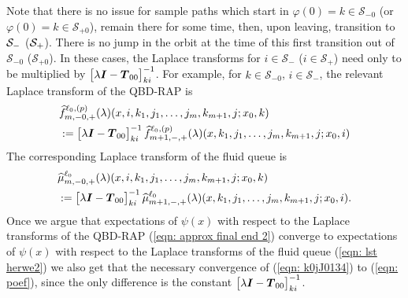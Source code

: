 Note that there is no issue for sample paths which start in \(\varphi(0)=k\in\mathcal S_{-0}\) (or \(\varphi(0)=k\in\mathcal S_{+0}\)), remain there for some time, then, upon leaving, transition to \(\mathcal{S}_-\) (\(\mathcal{S}_+\)). There is no jump in the orbit at the time of this first transition out of \(\mathcal S_{-0}\) (\(\mathcal S_{+0}\)). In these cases, the Laplace transforms for \(i\in\mathcal S_-\) (\(i\in\mathcal S_+\)) need only to be multiplied by \(\begin{bmatrix} \lambda \boldsymbol I - \boldsymbol T_{00} \end{bmatrix}^{-1}_{ki}\). For example, for \(k\in\mathcal S_{-0}\), \(i\in\mathcal S_{-}\), the relevant Laplace transform of the QBD-RAP is 
\begin{align}
		\nonumber &\widehat{f}_{m,-0,+}^{\ell_0,(p)}(\lambda)(x,i,k_1,j_1,\dots,j_m,k_{m+1},j;x_0,k) 
		\\&:=\vligne{\lambda \bs I - \bs T_{00}}^{-1}_{ki}\widehat{f}_{m+1,-,+}^{\ell_0,(p)}(\lambda)(x,k_1,j_1,\dots,j_m,k_{m+1},j;x_0,i)
		\label{eqn: k0jJ0134}%
\end{align} 
The corresponding Laplace transform of the fluid queue is 
\begin{align}
	&\widehat \mu_{m,-0,+}^{\ell_0}(\lambda)(x,i,k_1,j_1,\dots,j_m,k_{m+1},j;x_0,k) \nonumber 
	\\&:= \begin{bmatrix} \lambda \boldsymbol I - \boldsymbol T_{00} \end{bmatrix}^{-1}_{ki}\widehat \mu_{m+1,-,+}^{\ell_0}(\lambda)(x,k_1,j_1,\dots,j_m,k_{m+1},j;x_0,i). \label{eqn:  poef}
\end{align}
Once we argue that expectations of \(\psi(x)\) with respect to the Laplace transforms of the QBD-RAP (\ref{eqn: approx final end 2}) converge to expectations of \(\psi(x)\) with respect to the Laplace transforms of the fluid queue (\ref{eqn: lst herwe2}) we also get that the necessary convergence of (\ref{eqn: k0jJ0134}) to (\ref{eqn:  poef}), since the only difference is the constant \(\begin{bmatrix} \lambda \boldsymbol I - \boldsymbol T_{00} \end{bmatrix}^{-1}_{ki}\). 

